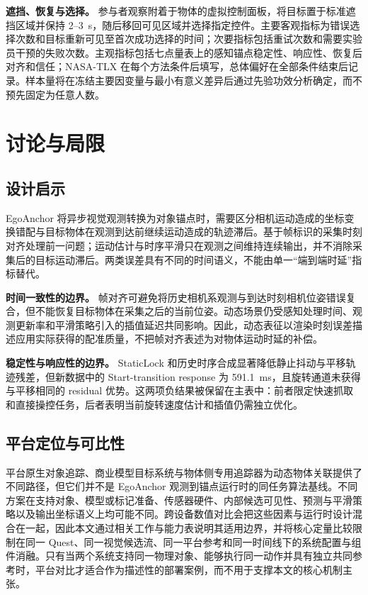 \documentclass[9pt,twocolumn,letterpaper]{extarticle}
\begin{document}
\textbf{遮挡、恢复与选择。} 参与者观察附着于物体的虚拟控制面板，将目标置于标准遮挡区域并保持 2--3~s，随后移回可见区域并选择指定控件。主要客观指标为错误选择次数和目标重新可见至首次成功选择的时间；次要指标包括重试次数和需要实验员干预的失败次数。主观指标包括七点量表上的感知锚点稳定性、响应性、恢复后对齐和信任；NASA-TLX 在每个方法条件后填写，总体偏好在全部条件结束后记录。样本量将在冻结主要因变量与最小有意义差异后通过先验功效分析确定，而不预先固定为任意人数。

\section{讨论与局限}\label{sec:discussion}


\subsection{设计启示}


EgoAnchor 将异步视觉观测转换为对象锚点时，需要区分相机运动造成的坐标变换错配与目标物体在观测到达前继续运动造成的轨迹滞后。基于帧标识的采集时刻对齐处理前一问题；运动估计与时序平滑只在观测之间维持连续输出，并不消除采集后的目标运动滞后。两类误差具有不同的时间语义，不能由单一“端到端时延”指标替代。

\textbf{时间一致性的边界。} 帧对齐可避免将历史相机系观测与到达时刻相机位姿错误复合，但不能恢复目标物体在采集之后的当前位姿。动态场景仍受感知处理时间、观测更新率和平滑策略引入的插值延迟共同影响。因此，动态表征以渲染时刻误差描述应用实际获得的配准质量，不把帧对齐表述为对物体运动时延的补偿。

\textbf{稳定性与响应性的边界。} StaticLock 和历史时序合成显著降低静止抖动与平移轨迹残差，但新数据中的 Start-transition response 为 591.1~ms，且旋转通道未获得与平移相同的 residual 优势。这两项负结果被保留在主表中：前者限定快速抓取和直接操控任务，后者表明当前旋转速度估计和插值仍需独立优化。

\subsection{平台定位与可比性}

平台原生对象追踪、商业模型目标系统与物体侧专用追踪器为动态物体关联提供了不同路径，但它们并不是 EgoAnchor 观测到锚点运行时的同任务算法基线。不同方案在支持对象、模型或标记准备、传感器硬件、内部候选可见性、预测与平滑策略以及输出坐标语义上均可能不同。跨设备数值对比会把这些因素与运行时设计混合在一起，因此本文通过相关工作与能力表说明其适用边界，并将核心定量比较限制在同一 Quest、同一视觉候选流、同一平台参考和同一时间线下的系统配置与组件消融。只有当两个系统支持同一物理对象、能够执行同一动作并具有独立共同参考时，平台对比才适合作为描述性的部署案例，而不用于支撑本文的核心机制主张。
\end{document}
